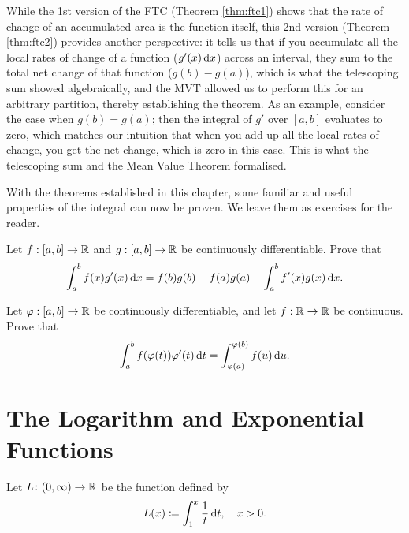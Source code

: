 \documentclass[../analysis1.tex]{subfiles}
\begin{document}
\begin{remark}
    While the 1st version of the FTC (Theorem \ref{thm:ftc1}) shows that the rate of change of an accumulated area is the function itself, this 2nd version (Theorem \ref{thm:ftc2}) provides another perspective: it tells us that if you accumulate all the local rates of change of a function ($g'(x) \d{x}$) across an interval, they sum to the total net change of that function ($g(b) - g(a)$), which is what the telescoping sum showed algebraically, and the MVT allowed us to perform this for an arbitrary partition, thereby establishing the theorem. As an example, consider the case when $g(b)=g(a)$; then the integral of $g'$ over $[a,b]$ evaluates to zero, which matches our intuition that when you add up all the local rates of change, you get the net change, which is zero in this case. This is what the telescoping sum and the Mean Value Theorem formalised. 
\end{remark}

With the theorems established in this chapter, some familiar and useful properties of the integral can now be proven. We leave them as exercises for the reader.

\begin{exercise*}
    Let $f:[a,b]\to\mathbb{R}$ and $g:[a,b]\to\mathbb{R}$ be continuously differentiable. Prove that
    \[\int_a^b f(x)g'(x)\d{x} = f(b)g(b)-f(a)g(a)-\int_a^b f'(x)g(x)\d{x}.\]
\end{exercise*}

\begin{exercise*}
    Let $\varphi:[a,b]\to\mathbb{R}$ be continuously differentiable, and let $f:\mathbb{R}\to\mathbb{R}$ be continuous. Prove that
    \[\int_a^b f(\varphi(t))\varphi'(t)\d{t}=\int_{\varphi(a)}^{\varphi(b)}f(u)\d{u}.\] 
\end{exercise*}

\section{The Logarithm and Exponential Functions}

\begin{definition}
    \begin{shaded*}
        Let $L \colon (0, \infty) \to \mathbb{R}$ be the function defined by
        \[
            L(x) \coloneqq \int_1^x \frac{1}{t} \d{t}, \quad x > 0.
        \]
    \end{shaded*}
\end{definition}
\end{document}
